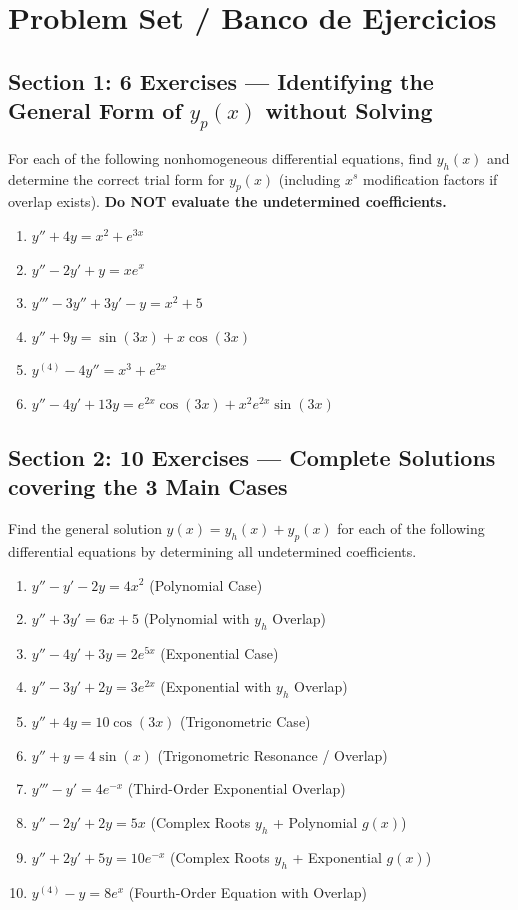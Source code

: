 \documentclass[11pt,letterpaper]{article}
\begin{document}
\newpage
\section{Problem Set / Banco de Ejercicios}

\subsection*{Section 1: 6 Exercises — Identifying the General Form of $y_p(x)$ without Solving}
For each of the following nonhomogeneous differential equations, find $y_h(x)$ and determine the correct trial form for $y_p(x)$ (including $x^s$ modification factors if overlap exists). \textbf{Do NOT evaluate the undetermined coefficients.}

\begin{enumerate}[label=\textbf{1.\arabic*}]
    \item $y'' + 4y = x^2 + e^{3x}$
    \item $y'' - 2y' + y = x e^x$
    \item $y''' - 3y'' + 3y' - y = x^2 + 5$
    \item $y'' + 9y = \sin(3x) + x \cos(3x)$
    \item $y^{(4)} - 4y'' = x^3 + e^{2x}$
    \item $y'' - 4y' + 13y = e^{2x} \cos(3x) + x^2 e^{2x} \sin(3x)$
\end{enumerate}

\subsection*{Section 2: 10 Exercises — Complete Solutions covering the 3 Main Cases}
Find the general solution $y(x) = y_h(x) + y_p(x)$ for each of the following differential equations by determining all undetermined coefficients.

\begin{enumerate}[label=\textbf{2.\arabic*}]
    \item $y'' - y' - 2y = 4x^2$ \quad (Polynomial Case)
    \item $y'' + 3y' = 6x + 5$ \quad (Polynomial with $y_h$ Overlap)
    \item $y'' - 4y' + 3y = 2e^{5x}$ \quad (Exponential Case)
    \item $y'' - 3y' + 2y = 3e^{2x}$ \quad (Exponential with $y_h$ Overlap)
    \item $y'' + 4y = 10\cos(3x)$ \quad (Trigonometric Case)
    \item $y'' + y = 4\sin(x)$ \quad (Trigonometric Resonance / Overlap)
    \item $y''' - y' = 4e^{-x}$ \quad (Third-Order Exponential Overlap)
    \item $y'' - 2y' + 2y = 5x$ \quad (Complex Roots $y_h$ + Polynomial $g(x)$)
    \item $y'' + 2y' + 5y = 10 e^{-x}$ \quad (Complex Roots $y_h$ + Exponential $g(x)$)
    \item $y^{(4)} - y = 8 e^x$ \quad (Fourth-Order Equation with Overlap)
\end{enumerate}
\end{document}
